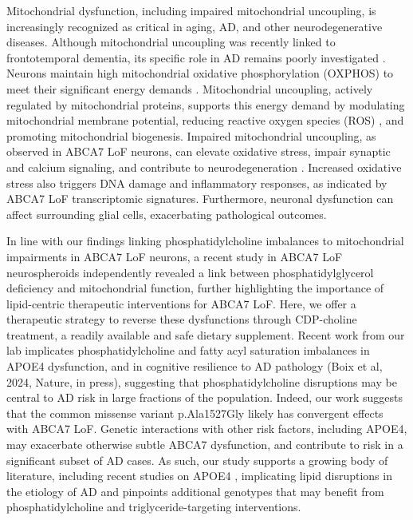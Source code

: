 Mitochondrial dysfunction, including impaired mitochondrial uncoupling, is increasingly recognized as critical in aging, AD, and other neurodegenerative diseases. Although mitochondrial uncoupling was recently linked to frontotemporal dementia, its specific role in AD remains poorly investigated \cite{noauthor_2022-os,Bano2023-qz,Zong2024-tn,Demine2019-qj,noauthor_2013-rt,Picca2023-gt}. Neurons maintain high mitochondrial oxidative phosphorylation (OXPHOS) to meet their significant energy demands \cite{Morant-Ferrando2023-va,Trigo2022-ym}. Mitochondrial uncoupling, actively regulated by mitochondrial proteins\cite{Park2023-fa,noauthor_2016-fg}, supports this energy demand by modulating mitochondrial membrane potential, reducing reactive oxygen species (ROS) \cite{Demine2019-qj,Shadel2015-kt}, and promoting mitochondrial biogenesis\cite{Korshunov1997-aj,Wisloff2005-ho,Andrews2005-yy,noauthor_2022-vx}. Impaired mitochondrial uncoupling, as observed in ABCA7 LoF neurons, can elevate oxidative stress, impair synaptic and calcium signaling, and contribute to neurodegeneration \cite{Korshunov1997-aj,Wisloff2005-ho,Andrews2005-yy,noauthor_2022-vx}. Increased oxidative stress also triggers DNA damage and inflammatory responses, as indicated by ABCA7 LoF transcriptomic signatures\cite{Robert2020-sc,Volanti2002-mc,Canty1999-oj,Schreck1992-zr}. Furthermore, neuronal dysfunction can affect surrounding glial cells, exacerbating pathological outcomes\cite{Byrns2024-id,Welch2022-ef}.

In line with our findings linking phosphatidylcholine imbalances to mitochondrial impairments in ABCA7 LoF neurons, a recent study in ABCA7 LoF neurospheroids independently revealed a link between phosphatidylglycerol deficiency and mitochondrial function\cite{Kawatani2023-vf}, further highlighting the importance of lipid-centric therapeutic interventions for ABCA7 LoF. Here, we offer a therapeutic strategy to reverse these dysfunctions through CDP-choline treatment, a readily available and safe dietary supplement\cite{Gavrilova2018-oi,Zeisel2009-xv,Blusztajn2017-nv}.  Recent work from our lab implicates phosphatidylcholine and fatty acyl saturation imbalances in APOE4 dysfunction\cite{Sienski2021-zt}, and in cognitive resilience to AD pathology (Boix et al, 2024, Nature, in press), suggesting that phosphatidylcholine disruptions may be central to AD risk in large fractions of the population. Indeed, our work suggests that the common missense variant p.Ala1527Gly likely has convergent effects with ABCA7 LoF. Genetic interactions with other risk factors, including APOE4, may exacerbate otherwise subtle ABCA7 dysfunction, and contribute to risk in a significant subset of AD cases\cite{Wang2021-oa,Hemani2013-zr,Haig2011-vs,Zuk2012-uz}. As such, our study supports a growing body of literature, including recent studies on APOE4 \cite{Haney2024-fx,Victor2022-tl}, implicating lipid disruptions in the etiology of AD and pinpoints additional genotypes that may benefit from phosphatidylcholine and triglyceride-targeting interventions.


